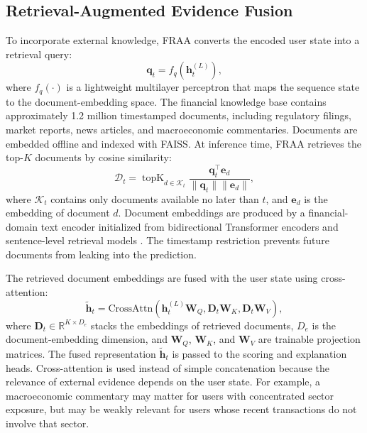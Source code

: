 \documentclass[runningheads]{llncs}
\begin{document}
\subsection{Retrieval-Augmented Evidence Fusion}
\label{sec:retrieval}
To incorporate external knowledge, FRAA converts the encoded user state into a retrieval query:
\begin{equation}
\mathbf{q}_t = f_q(\mathbf{h}_t^{(L)}),
\label{eq:query}
\end{equation}
where $f_q(\cdot)$ is a lightweight multilayer perceptron that maps the sequence state to the document-embedding space. The financial knowledge base contains approximately 1.2 million timestamped documents, including regulatory filings, market reports, news articles, and macroeconomic commentaries. Documents are embedded offline and indexed with FAISS. At inference time, FRAA retrieves the top-$K$ documents by cosine similarity:
\begin{equation}
\mathcal{D}_t =
\operatorname{topK}_{d \in \mathcal{K}_t}
\frac{\mathbf{q}_t^\top \mathbf{e}_d}{\|\mathbf{q}_t\|\|\mathbf{e}_d\|},
\label{eq:retrieval}
\end{equation}
where $\mathcal{K}_t$ contains only documents available no later than $t$, and $\mathbf{e}_d$ is the embedding of document $d$. Document embeddings are produced by a financial-domain text encoder initialized from bidirectional Transformer encoders and sentence-level retrieval models \cite{devlin2019bert,reimers2019sentence}. The timestamp restriction prevents future documents from leaking into the prediction.

The retrieved document embeddings are fused with the user state using cross-attention:
\begin{equation}
\tilde{\mathbf{h}}_t =
\mathrm{CrossAttn}
\left(
\mathbf{h}_t^{(L)}\mathbf{W}_Q,
\mathbf{D}_t\mathbf{W}_K,
\mathbf{D}_t\mathbf{W}_V
\right),
\label{eq:cross_attention}
\end{equation}
where $\mathbf{D}_t \in \mathbb{R}^{K \times D_e}$ stacks the embeddings of retrieved documents, $D_e$ is the document-embedding dimension, and $\mathbf{W}_Q$, $\mathbf{W}_K$, and $\mathbf{W}_V$ are trainable projection matrices. The fused representation $\tilde{\mathbf{h}}_t$ is passed to the scoring and explanation heads. Cross-attention is used instead of simple concatenation because the relevance of external evidence depends on the user state. For example, a macroeconomic commentary may matter for users with concentrated sector exposure, but may be weakly relevant for users whose recent transactions do not involve that sector.
\end{document}
